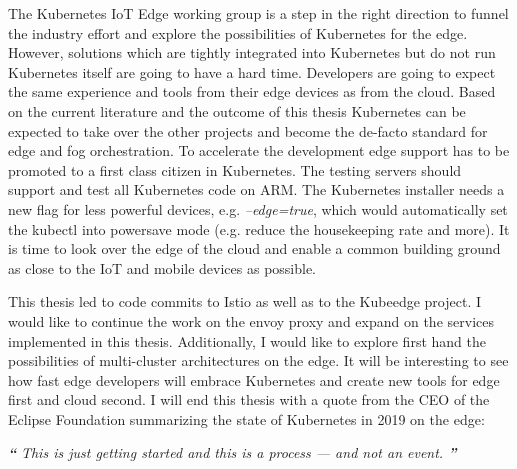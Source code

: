 The Kubernetes IoT Edge working group\cite{IntroducingDejanBosanac:KubernetesIoTEdgeWorkingGroup} is a step in the right direction to funnel the industry effort and explore the possibilities of Kubernetes for the edge. However, solutions which are tightly integrated into Kubernetes but do not run Kubernetes itself are going to have a hard time. Developers are going to expect the same experience and tools from their edge devices as from the cloud. Based on the current literature and the outcome of this thesis Kubernetes can be expected to take over the other projects and become the de-facto standard for edge and fog orchestration. To accelerate the development edge support has to be promoted to a first class citizen in Kubernetes. The testing servers should support and test all Kubernetes code on ARM. The Kubernetes installer needs a new flag for less powerful devices, e.g. \textit{--edge=true}, which would automatically set the kubectl into powersave mode (e.g. reduce the housekeeping rate and more). It is time to look over the edge of the cloud and enable a common building ground as close to the IoT and mobile devices as possible.

This thesis led to code commits to Istio as well as to the Kubeedge project. I would like to continue the work on the envoy proxy and expand on the services implemented in this thesis. Additionally, I would like to explore first hand the possibilities of multi-cluster architectures on the edge. It will be interesting to see how fast edge developers will embrace Kubernetes and create new tools for edge first and cloud second.
I will end this thesis with a quote from the CEO of the Eclipse Foundation summarizing the state of Kubernetes in 2019 on the edge:
\begin{displayquote}
\textit{\textbf{\Huge{``}}}
\textit{\large{
This is just getting started and this is a process — and not an event.\cite{ioFogMainBlog:online}
}}
\textit{\textbf{\Huge{''}}}
\\[1pt]
\end{displayquote}
